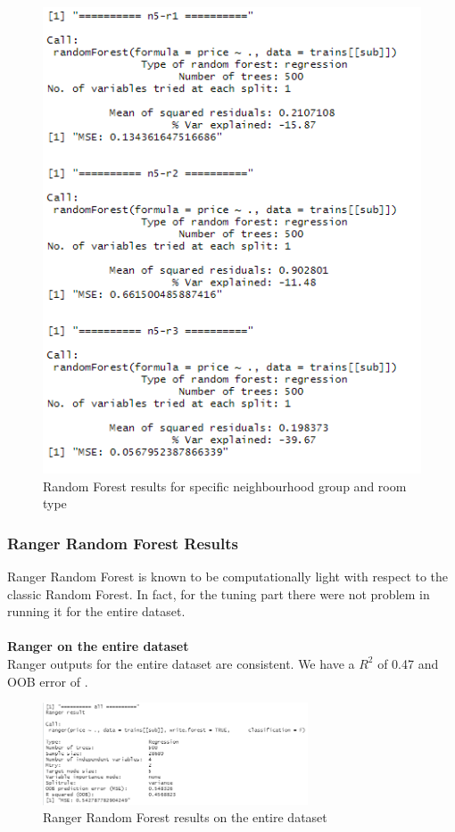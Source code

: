 \documentclass{FR16}
\begin{document}
\begin{figure}[!htb]
\begin{minipage}{0.33\textwidth}
     \includegraphics[width=1\linewidth]{figures/rf6.png}
   \end{minipage}
        \caption{Random Forest results for specific neighbourhood group and room type}\label{fig:15}

\end{figure}

\newpage
\subsubsection{Ranger Random Forest Results}
Ranger Random Forest is known to be computationally light with respect to the classic Random Forest. In fact, for the tuning part there were not problem in running it for the entire dataset. 
\\\\ \textbf{Ranger on the entire dataset }\\
Ranger outputs for the entire dataset are consistent. We have a $R^2$ of 0.47 and OOB error of .

\begin{figure}[h]
\centering
\includegraphics[width=0.7\textwidth]{figures/rgn.PNG} 
 \caption{\label{fig:16} Ranger Random Forest results on the entire dataset}
\end{figure}
\end{document}
